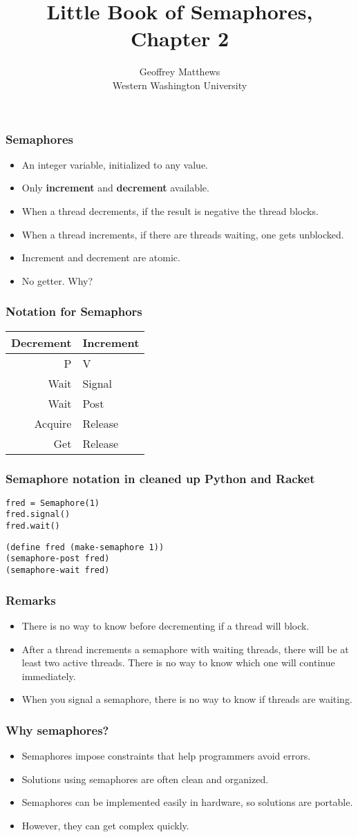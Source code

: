 \documentclass{beamer}
\title{Little Book of Semaphores, Chapter 2}
\author{Geoffrey Matthews\\
\small Western Washington University}
\newcommand{\bi}{\begin{itemize}}
\newcommand{\ii}{\item}
\newcommand{\ei}{\end{itemize}}
\newcommand{\bfr}[1]{\begin{frame}[fragile]\frametitle{{ #1 }}}
\begin{document}
\maketitle

\bfr{Semaphores}
\bi
\ii An integer variable, initialized to any value.
\ii Only {\bf increment} and {\bf decrement} available.
\ii When a thread decrements, if the result is negative the thread blocks.
\ii When a thread increments, if there are threads waiting, one gets unblocked.
\ii Increment and decrement are atomic.
\pause
\ii No getter.  Why?
\ei
\end{frame}

\bfr{Notation for Semaphors}

\begin{center}
\begin{tabular}{r|l}
 Decrement & Increment\\\hline
 P & V\\
 Wait & Signal\\
 Wait & Post\\
 Acquire & Release\\
 Get & Release
\end{tabular}
\end{center}

\end{frame}


\bfr{Semaphore notation in cleaned up Python and Racket}


\begin{Verbatim}
fred = Semaphore(1)
fred.signal()
fred.wait()
\end{Verbatim}

\begin{Verbatim}
(define fred (make-semaphore 1))
(semaphore-post fred)
(semaphore-wait fred)
\end{Verbatim}


\end{frame}
\bfr{Remarks}
\bi
\ii There is no way to know before decrementing if a thread will block.
\ii After a thread increments a semaphore with waiting threads,
there will be at least two active threads.
There is no way to know which one will continue immediately.
\ii When you signal a semaphore, there is no way to know if threads are
waiting.
\ei
\end{frame}
\bfr{Why semaphores?}
\bi
\ii Semaphores impose constraints that help programmers avoid errors.
\ii Solutions using semaphores are often clean and organized.
\ii Semaphores can be implemented easily in hardware, so solutions are
portable.  \pause
\ii However, they can get complex quickly.
\ei
\end{frame}
\end{document}
